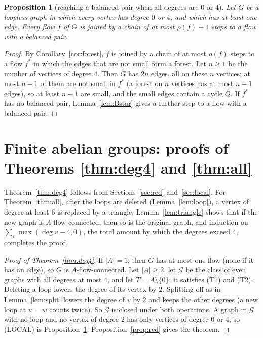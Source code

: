 \documentclass[11pt]{article}
\newtheorem{proposition}[theorem]{Proposition}
\theoremstyle{definition}
\newcommand{\cG}{\mathcal{G}}
\begin{document}
\begin{proposition}[reaching a balanced pair when all degrees are $0$ or $4$]\label{prop:local4}
Let $G$ be a loopless graph in which every vertex has degree $0$ or $4$, and which has at least one edge. Every flow $f$ of $G$ is joined by a chain of at most $\rho(f)+1$ steps to a flow with a balanced pair.
\end{proposition}
\begin{proof}
By Corollary~\ref{cor:forest}, $f$ is joined by a chain of at most $\rho(f)$ steps to a flow $f^*$ in which the
edges that are not small form a forest. Let $n\ge 1$ be the number of vertices of degree $4$. Then $G$ has $2n$ edges, all on these
$n$ vertices; at most $n-1$ of them are not small in $f^*$ (a forest on $n$ vertices has at most $n-1$ edges), so at
least $n+1$ are small, and the small edges contain a cycle $Q$. If $f^*$ has no balanced pair,
Lemma~\ref{lem:Bstar} gives a further step to a flow with a balanced pair.
\end{proof}

\section{Finite abelian groups: proofs of Theorems \ref{thm:deg4} and \ref{thm:all}}\label{sec:proofs}

Theorem~\ref{thm:deg4} follows from Sections~\ref{sec:red} and~\ref{sec:local}. For Theorem~\ref{thm:all}, after the loops are
deleted (Lemma~\ref{lem:loop}), a vertex of degree at least $6$ is replaced by a triangle; Lemma~\ref{lem:triangle} shows that if the new graph is
$A$-flow-connected, then so is the original graph, and induction on $\sum_v\max(\deg v-4,0)$, the total amount by which the degrees exceed $4$, completes the proof.

\begin{proof}[Proof of Theorem~\ref{thm:deg4}]
If $|A|=1$, then $G$ has at most one flow (none if it has an edge), so $G$ is $A$-flow-connected. Let $|A|\ge 2$, let $\cG$ be the class of even graphs with all degrees at most $4$, and let $T=A\setminus\{0\}$; it satisfies \textup{(T1)} and \textup{(T2)}. Deleting a loop lowers the degree of its vertex by $2$. Splitting off as in Lemma~\ref{lem:split} lowers the degree of $v$ by $2$ and keeps the other degrees
(a new loop at $u=w$ counts twice). So $\cG$ is closed under both operations. A graph in $\cG$ with no loop and no
vertex of degree $2$ has only vertices of degree $0$ or $4$, so \textup{(LOCAL)} is Proposition~\ref{prop:local4}.
Proposition~\ref{prop:red} gives the theorem.
\end{proof}
\end{document}
